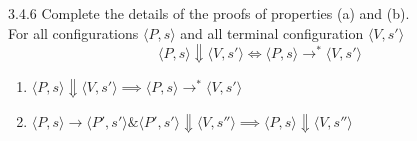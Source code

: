 \begin{exercise}{3.4.6} Complete the details of the proofs of properties (a) and (b).
\\
For all configurations $\langle P, s \rangle$ and all terminal configuration $\langle V, s' \rangle$
\[ \langle P,s\rangle \Downarrow \langle V,s'\rangle \iff \langle P,s\rangle \to^* \langle V,s'\rangle\]
\begin{enumerate}[label=(\alph*)]
\item $ \langle P,s\rangle \Downarrow \langle V,s'\rangle \implies \langle P,s\rangle \rightarrow^* \langle V,s'\rangle$

\item $\langle P,s\rangle \rightarrow \langle P',s'\rangle \& \langle P',s'\rangle \Downarrow \langle V,s''\rangle \implies \langle P,s\rangle \Downarrow \langle V,s''\rangle$
\end{enumerate}
\end{exercise}

